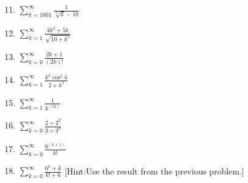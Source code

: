 \documentclass[12pt]{article}
\newif\ifans
\begin{document}
\begin{enumerate}
\setcounter{enumi}{10}

\item $\sum_{k=1001}^{\infty}{\frac{1}{\sqrt[3]{k}-10 }}$

\ifans{\fbox{The series diverges by the Comparison Test.  Compared to $\sum_{k=1001}^{\infty}{\frac{1}{\sqrt[3]{k}}}$.}} \fi

\item $\sum_{k=1}^{\infty}{\frac{4k^2+5k}{\sqrt{10+k^5} }}$

\ifans{\fbox{\parbox{1\linewidth}{The series diverges by the Limit Comparison Test.  Compared to $\sum_{k=1}^{\infty}{\frac{1}{\sqrt{k}}}$.; \\Detailed Solution: \textcolor{blue}{\href{http://www.math.drexel.edu/classes/Calculus/resources/Math123HW/Solutions/123_09_Comparison_Ratio_Root_Tests_12.pdf}{Here}}}}} \fi



\item $\sum_{k=0}^{\infty}{\frac{2k+1}{(2k)! }}$

\ifans{\fbox{The series converges by the Ratio Test.}} \fi

\item $\sum_{k=1}^{\infty}{\frac{k^2\cos^2k}{2+k^5 }}$

\ifans{\fbox{The series converges by the Comparison Test.  Compared to $\sum_{k=1}^{\infty}{\frac{1}{k^3}}$.}} \fi

\item $\sum_{k=1}^{\infty}{\frac{1}{k^{(5k)}}}$

\ifans{\fbox{The series converges by the Root Test.}} \fi

\item $\sum_{k=0}^{\infty}{\frac{2+2^k}{3+3^k }}$

\ifans{\fbox{The series converges by the Limit Comparison Test.  Compared to $\sum_{k=0}^{\infty}{\left(\frac{2}{3}\right)^k     }$.}} \fi

\item $\sum_{k=0}^{\infty}{\frac{6^{(k+1)}}{k! }}$

\ifans{\fbox{The series converges by the Ratio Test.}} \fi

\item $\sum_{k=0}^{\infty}{\frac{6^k+k}{k!+6 }}$ [Hint:Use the result from the previous problem.]

\ifans{\fbox{The series converges by the Comparison Test.  Compared to $\sum_{k=0}^{\infty}{\frac{6^{(k+1)}}{k! }}$.; Detailed Solution: \textcolor{blue}{\href{http://www.math.drexel.edu/classes/Calculus/resources/Math123HW/Solutions/123_09_Comparison_Ratio_Root_Tests_18.pdf}{Here}}}} \fi


\end{enumerate}
\end{document}
